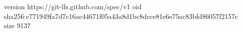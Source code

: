 version https://git-lfs.github.com/spec/v1
oid sha256:e771949fa7d7c16ae44671f05a43a8d1bc8dcce81e6e75ac83bfd86057f2157c
size 9137
